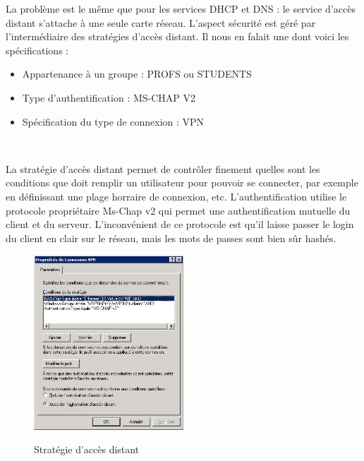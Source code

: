 La problème est le même que pour les services DHCP et DNS : le service d'accès distant s'attache à une seule carte réseau.
L'aspect sécurité est géré par l'intermédiaire des stratégies d'accès distant. Il nous en falait une dont voici les spécifications :

\begin{itemize}
 	\item Appartenance à un groupe : PROFS ou STUDENTS
	\item Type d'authentification : MS-CHAP V2
	\item Spécification du type de connexion : VPN
\end{itemize}
~

La stratégie d'accès distant permet de contrôler finement quelles sont les conditions que doit remplir un utilisateur pour pouvoir se connecter, par exemple en définissant une plage horraire de connexion, etc. L'authentification utilise le protocole propriétaire Ms-Chap v2 qui permet une authentification mutuelle du client et du serveur. L'inconvénient de ce protocole est qu'il laisse passer le login du client en clair sur le réseau, mais les mots de passes sont bien sûr hashés.

\begin{figure}[H]
	\begin{center}
		\includegraphics[width=0.50\textwidth]{partie_2/screen_windows/strat.png}\\
	\end{center}
	\caption{Stratégie d'accès distant}
	\label{VPN_STRAT}
\end{figure}

